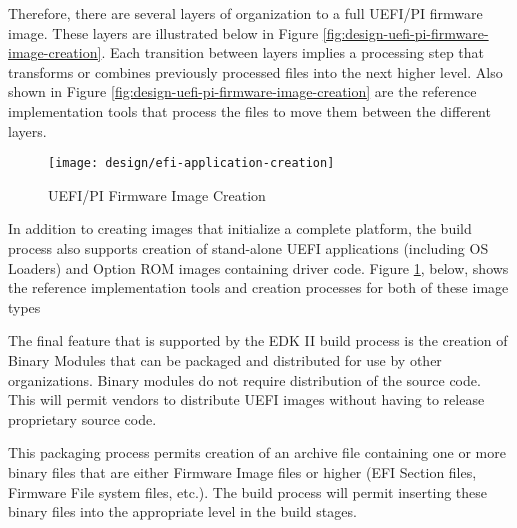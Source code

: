 Therefore, there are several layers of organization to a full UEFI/PI firmware image. These layers are illustrated below in Figure \ref{fig:design-uefi-pi-firmware-image-creation}. Each transition between layers implies a processing step that transforms or combines previously processed files into the next higher level. Also shown in Figure \ref{fig:design-uefi-pi-firmware-image-creation} are the reference implementation tools that process the files to move them between the different layers.

\begin{figure}[h]
	\centering
	\texttt{[image: design/efi-application-creation]}
	\caption{UEFI/PI Firmware Image Creation}\label{fig:design-efi-application-creation}
\end{figure}


In addition to creating images that initialize a complete platform, the build process also supports creation of stand-alone UEFI applications (including OS Loaders) and Option ROM images containing driver code. Figure \ref{fig:design-efi-application-creation}, below, shows the reference implementation tools and creation processes for both of these image types

The final feature that is supported by the EDK II build process is the creation of Binary Modules that can be packaged and distributed for use by other organizations. Binary modules do not require distribution of the source code. This will permit vendors to distribute UEFI images without having to release proprietary source code.

This packaging process permits creation of an archive file containing one or more binary files that are either Firmware Image files or higher (EFI Section files, Firmware File system files, etc.). The build process will permit inserting these binary files into the appropriate level in the build stages.